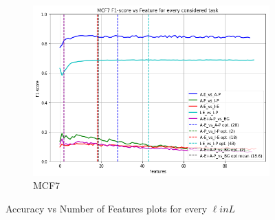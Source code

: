 \begin{figure}[!htb]
    \begin{subfigure}[b]{0.48\textwidth}
        \includegraphics[width=\textwidth]{images/features_plots/MCF7_feature_plot.png}
        \caption{MCF7}
        \label{fig:MCF7_n_feat}
    \end{subfigure}
    \caption{Accuracy vs Number of Features plots for every $\ell in L$}\label{fig:feats_plot}
\end{figure}

